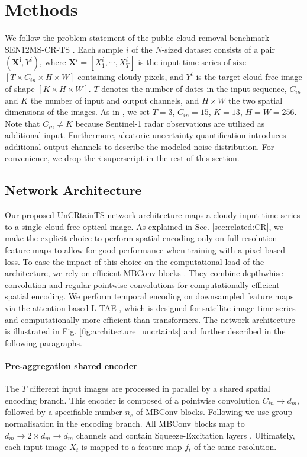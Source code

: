\documentclass[10pt,twocolumn,letterpaper]{article}
\newcommand{\figref}[1]{ Fig. \ref{#1}}
\begin{document}
\section{Methods}

We follow the problem statement of the public cloud removal benchmark SEN12MS-CR-TS \cite{ebel2022sen12ms}. Each sample $i$ of the $N$-sized dataset consists of a pair $(\boldsymbol{X^i},Y^i)$, where $\boldsymbol{X}^i=[X^i_1, \cdots, X^i_T]$ is the input time series of size $\left[T\times C_{in} \times H \times W \right]$ containing cloudy pixels, and $Y^i$ is the target cloud-free image of shape $\left[ K \times H \times W \right]$. $T$ denotes the number of dates in the input sequence, $C_{in}$ and $K$ the number of input and output channels, and $H\times W$ the two spatial dimensions of the images.  As in \cite{ebel2022sen12ms}, we set $T=3$, $C_{in}=15$, $K=13$, $H=W=256$. Note that $C_{in} \neq K$ because Sentinel-1 radar observations are utilized as additional input. Furthermore, aleatoric uncertainty quantification introduces additional output channels to describe the modeled noise distribution. For convenience, we drop the $i$ superscript in the rest of this section. 


\subsection{Network Architecture}
Our proposed UnCRtainTS network architecture maps a cloudy input time series to a single cloud-free optical image. As explained in Sec. \ref{sec:related:CR}, we make the explicit choice to perform spatial encoding only on full-resolution feature maps to allow for good performance when training with a pixel-based loss. To ease the impact of this choice on the computational load of the architecture, we rely on efficient MBConv blocks \cite{sandler2018mobilenetv2}. They combine depthwhise convolution and regular pointwise convolutions for computationally efficient spatial encoding. We perform temporal encoding on downsampled feature maps via the attention-based L-TAE \cite{garnot2020lightweight},
which is designed for satellite image time series and computationally more efficient than transformers.
The network architecture is illustrated in \figref{fig:architecture_uncrtaints} and further described in the following paragraphs.

\paragraph{\bf Pre-aggregation shared encoder}
The $T$ different input images are processed in parallel by a shared spatial encoding branch. This encoder is composed of a pointwise convolution $C_{in} \rightarrow d_m$, followed by a specifiable number $n_e$ of MBConv blocks. Following \cite{garnot2021panoptic} we use group normalisation in the encoding branch.
All MBConv blocks map to $d_m \rightarrow 2 \times d_m \rightarrow d_m$ channels 
and contain Squeeze-Excitation layers \cite{hu2018squeeze}. Ultimately, each input image $X_{t}$ is mapped to a feature map $f_{t}$ of the same resolution.
\end{document}
